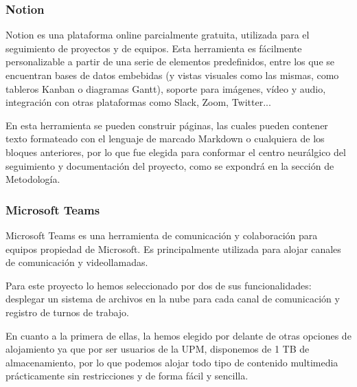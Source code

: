         \subsubsection{Notion}
            Notion es una plataforma online parcialmente gratuita, utilizada para el seguimiento de proyectos y de 
            equipos. Esta herramienta es fácilmente personalizable a partir de una serie de elementos predefinidos, 
            entre los que se encuentran bases de datos embebidas (y vistas visuales como las mismas, como tableros 
            Kanban o diagramas Gantt), soporte para imágenes, vídeo y audio, integración con otras plataformas como 
            Slack, Zoom, Twitter... \newline
                
            En esta herramienta se pueden construir páginas, las cuales pueden contener texto formateado con el 
            lenguaje de marcado Markdown o cualquiera de los bloques anteriores, por lo que fue elegida para conformar 
            el centro neurálgico del seguimiento y documentación del proyecto, como se expondrá en la sección de 
            Metodología. 
            
        \subsubsection{Microsoft Teams}
            Microsoft Teams es una herramienta de comunicación y colaboración para equipos propiedad de Microsoft. 
            Es principalmente utilizada para alojar canales de comunicación y videollamadas. \newline
                
            Para este proyecto lo hemos seleccionado por dos de sus funcionalidades: desplegar un sistema de archivos 
            en la nube para cada canal de comunicación y registro de turnos de trabajo. \newline
            
            En cuanto a la primera de ellas, la hemos elegido por delante de otras opciones de alojamiento ya 
            que por ser usuarios de la UPM, disponemos de 1 TB de almacenamiento, por lo que podemos alojar todo 
            tipo de contenido multimedia prácticamente sin restricciones y de forma fácil y sencilla. \newline
            
